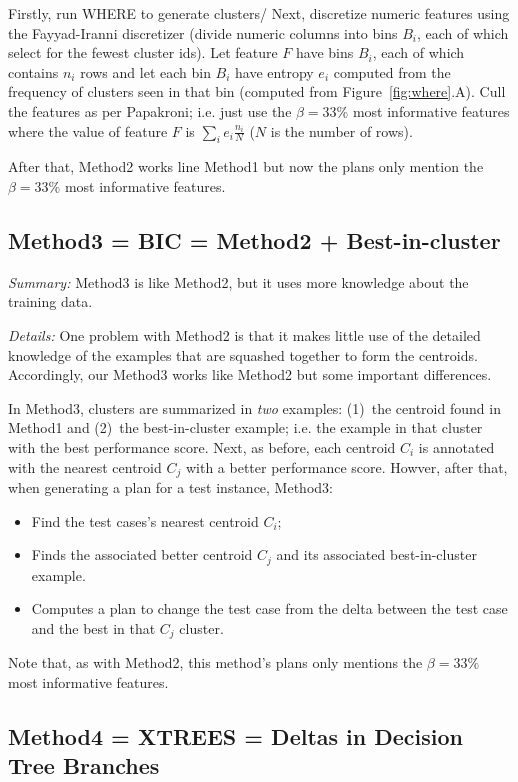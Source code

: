 \documentclass{sig-alternate}
\newcommand{\bi}{\begin{itemize}}
\newcommand{\ei}{\end{itemize}}
\newcommand{\fig}[1]{Figure~\ref{fig:#1}}
\begin{document}
Firstly, 
run  WHERE to generate   clusters/ Next,
discretize numeric features using the Fayyad-Iranni discretizer
(divide numeric columns into bins $B_i$, each of which  select for the fewest cluster ids).
Let feature $F$ have bins $B_i$, each of which contains $n_i$ rows
and 
let each bin $B_i$ have entropy $e_i$ computed from the frequency of clusters seen in that bin (computed from \fig{where}.A).
Cull the features as per Papakroni; i.e. just use the $\beta=33\%$ most informative features
where  the   value of  feature $F$ is $\sum_i e_i\frac{n_i}{N}$ ($N$ is the number of rows).

After that, Method2 works line Method1 but now the   plans  only
mention the $\beta=33\%$ most informative features.
\subsection{Method3 = BIC = Method2 + Best-in-cluster}\label{sect:BIC}

{\em Summary:} Method3 is like Method2, but it uses more knowledge about the training data.

{\em Details:}
One problem with Method2 is that it makes little use of the detailed knowledge
of the examples that are squashed together to form the centroids. Accordingly,
our Method3 works like Method2 but some important differences.

In Method3, clusters are summarized in {\em two} examples: (1)~the centroid found in Method1 and
(2)~the best-in-cluster example; i.e. the  example in that cluster
with the best performance score.
Next, as before, each centroid $C_i$ is annotated with the nearest centroid $C_j$
with a better performance score.
Howver, after that,  when generating a plan for a test instance, Method3:
\bi
\item
Find the test cases's nearest centroid $C_i$;
\item
Finds the associated better centroid $C_j$ and its associated best-in-cluster example.
\item
Computes a plan to change the test case  from the delta between the test case
and the best in that $C_j$ cluster.
\ei
Note that, as with Method2, this method's plans only mentions the  $\beta=33\%$ most informative features. 
%




\subsection{Method4 = XTREES = Deltas in Decision Tree Branches}
\end{document}
